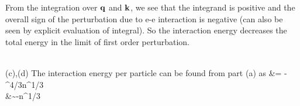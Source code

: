 \documentclass[10pt,letterpaper]{article}
\begin{document}
	\item
	From the integration over $\mathbf{q}$ and $\mathbf{k}$, we see that the integrand is positive and the overall sign of
	the perturbation due to e-e interaction is negative (can also be seen by explicit evaluation of integral). So the interaction 		energy decreases the total energy 
	in the limit of first order perturbation.
	\\ \\
	
	\item[(c),(d)]
	The interaction energy per particle can be found from part (a) as
	\ba
		 &= - ^{4/3}n^{1/3}\\
		&\sim -n^{1/3}
	\ea
	\eenum
\eenum
\end{document}
